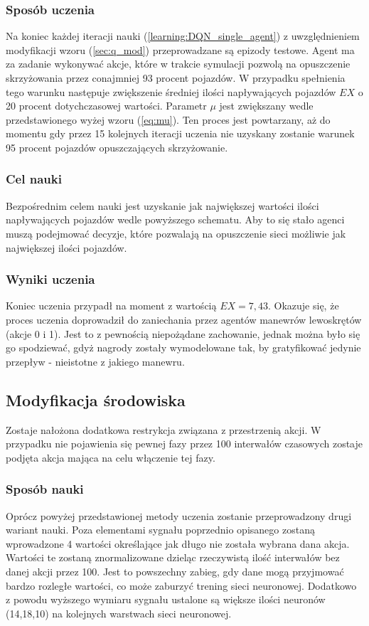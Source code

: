 \documentclass[12pt]{book}
\theoremstyle{plain}
\newcommand{\myref}[1]{(\ref{#1})}
\begin{document}
\subsubsection*{Sposób uczenia}
Na koniec każdej iteracji nauki \myref{learning:DQN_single_agent} z uwzględnieniem modyfikacji wzoru \myref{sec:q_mod} przeprowadzane są epizody testowe. Agent ma za zadanie wykonywać akcje, które w trakcie symulacji pozwolą na opuszczenie skrzyżowania przez conajmniej 93 procent pojazdów. W przypadku spełnienia tego warunku następuje zwiększenie średniej ilości napływających pojazdów $EX$ o 20 procent dotychczasowej wartości. Parametr $\mu$ jest zwiększany wedle przedstawionego wyżej wzoru \myref{eq:mu}. Ten proces jest powtarzany, aż do momentu gdy przez 15 kolejnych iteracji uczenia nie uzyskany zostanie warunek 95 procent pojazdów opuszczających skrzyżowanie.
\subsubsection*{Cel nauki}
Bezpośrednim celem nauki jest uzyskanie jak największej wartości ilości napływających pojazdów wedle powyższego schematu. Aby to się stało agenci muszą podejmować decyzje, które pozwalają na opuszczenie sieci możliwie jak największej ilości pojazdów.
\subsubsection*{Wyniki uczenia}
Koniec uczenia przypadł na moment z wartością $EX=7,43$. Okazuje się, że proces uczenia doprowadził do zaniechania przez agentów manewrów lewoskrętów (akcje 0 i 1). Jest to z pewnością niepożądane zachowanie, jednak można było się go spodziewać, gdyż nagrody zostały wymodelowane tak, by gratyfikować jedynie przepływ - nieistotne z jakiego manewru. 
\subsection{Modyfikacja środowiska}
Zostaje nałożona dodatkowa restrykcja związana z przestrzenią akcji. W przypadku nie pojawienia się pewnej fazy przez 100 interwałów czasowych zostaje podjęta akcja mająca na celu włączenie tej fazy.
\subsubsection*{Sposób nauki}
Oprócz powyżej przedstawionej metody uczenia zostanie przeprowadzony drugi wariant nauki. Poza elementami sygnału poprzednio opisanego zostaną wprowadzone 4 wartości określające jak długo nie została wybrana dana akcja. Wartości te zostaną znormalizowane dzieląc rzeczywistą ilość interwałów bez danej akcji przez 100. Jest to powszechny zabieg, gdy dane mogą przyjmować bardzo rozległe wartości, co może zaburzyć trening sieci neuronowej. Dodatkowo z powodu wyższego wymiaru sygnału ustalone są większe ilości neuronów (14,18,10) na kolejnych warstwach sieci neuronowej.
\end{document}
